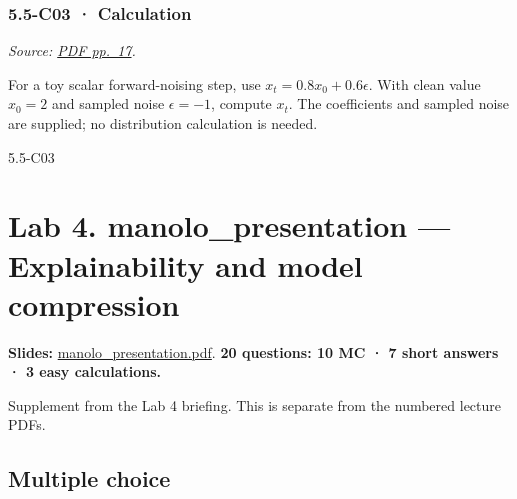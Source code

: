 \noindent\begin{minipage}{\linewidth}

\subsubsection{5.5-C03 · Calculation}\label{c03-calculation-16}

\emph{Source:
\href{../Lecture\%20Slides/5.5.\%20Generative\%20Models.pdf\#page=17}{PDF
pp.~17}.}

For a toy scalar forward-noising step, use \(x_t=0.8x_0+0.6\epsilon\).
With clean value \(x_0=2\) and sampled noise \(\epsilon=-1\), compute
\(x_t\). The coefficients and sampled noise are supplied; no
distribution calculation is needed.

\begin{solution}[26mm]{5.5-C03}

\end{solution}
\end{minipage}\par\medskip

\clearpage

\section{Lab 4. manolo\_presentation --- Explainability and model
compression}\label{lab-4.-manolo_presentation-explainability-and-model-compression}

\textbf{Slides:}
\href{../Lab\%20Sessions/Lab4/manolo_presentation.pdf}{manolo\_presentation.pdf}.
\textbf{20 questions: 10 MC · 7 short answers · 3 easy calculations.}

Supplement from the Lab 4 briefing. This is separate from the numbered
lecture PDFs.

\subsection{Multiple choice}\label{multiple-choice-18}

